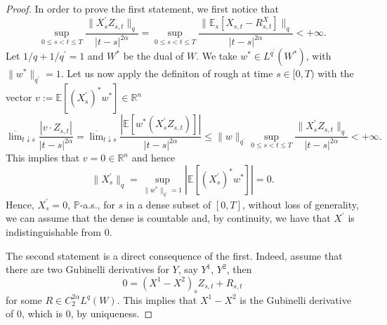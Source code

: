 \documentclass[10pt,a4paper]{amsart}
\newcommand{\R}{\mathbb{R}}
\begin{document}
\begin{proof}


    In order to prove the first statement, we first notice that
    \begin{equation*}
        \sup_{0\leq s<t\leq T}\frac{\| X^{\prime}_s Z_{s,t}\|_{q}}{|t-s|^{2\alpha}}
        = \sup_{0\leq s<t\leq T}\frac{\|\mathbb{E}_s[X_{s,t} - R^X_{s,t}]\|_q}{|t-s|^{2\alpha}}
        < +\infty.
    \end{equation*}
    Let $1/q + 1/q^{\prime} = 1$ and $W^{\ast}$ be the dual of $W$. We take $w^{\ast} \in L^{q^{\prime}}(W^{\ast})$, with $\|w^{\ast}\|_{q^{\prime}} = 1$.
    Let us now apply the definiton of rough at time $s\in[0,T)$ with the vector $v := \mathbb{E}[(X_s^{\prime})^{\ast}w^{\ast}] \in \R^n$
    \begin{equation*}
        \overline{\lim}_{t\downarrow s} \frac{|v\cdot Z_{s,t}|}{|t-s|^{2\alpha}}
        =
        \overline{\lim}_{t\downarrow s} \frac{|\mathbb{E}[w^{\ast}(X^{\prime}_sZ_{s,t})]|}{|t-s|^{2\alpha}}
        \leq
        \|w\|_{q^{\prime}} 
        \sup_{0\leq s<t\leq T}\frac{\| X^{\prime}_s Z_{s,t}\|_{q}}{|t-s|^{2\alpha}}
        < +\infty.
    \end{equation*}
    This implies that $v = 0 \in \R^{n}$ and hence 
    \begin{equation*}
        \|X^{\prime}_s\|_{q} = \sup_{\|w^{\ast}\|_{q^{\prime}}=1} |\mathbb{E}[(X^{\prime}_s)^{\ast}w^{\ast}]| = 0.
    \end{equation*}
    Hence, $X^{\prime}_s = 0$, $\mathbb{P}$-a.s., for $s$ in a dense subset of $[0,T]$, without loss of generality, we can assume that the dense is countable and, by continuity, we have that $X^{\prime}$ is indistinguishable from $0$.

    The second statement is a direct consequence of the first. Indeed, assume that there are two Gubinelli derivatives for $Y$, say $Y^1$, $Y^2$, then
    \begin{equation*}
        0 = (X^1-X^2)_{s}Z_{s,t} + R_{s,t}
    \end{equation*}
    for some $R \in C^{2\alpha}_2L^q(W)$. This implies that $X^1-X^2$ is the Gubinelli derivative of $0$, which is $0$, by uniqueness.
\end{proof}
\end{document}
